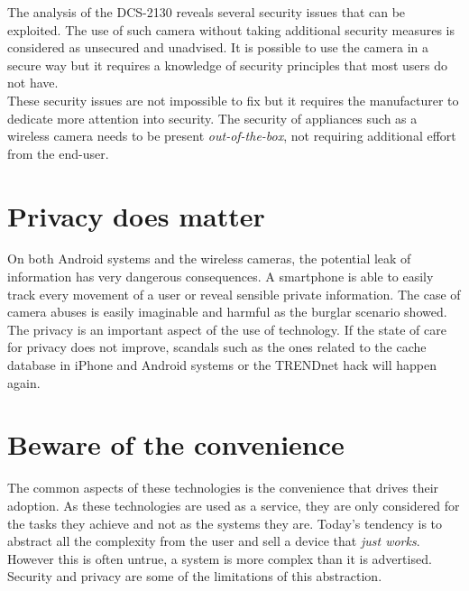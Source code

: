 The analysis of the DCS-2130 reveals several security issues that can be exploited.
The use of such camera without taking additional security measures is considered as unsecured and unadvised.
It is possible to use the camera in a secure way but it requires a knowledge of security principles that most users do not have.\\

These security issues are not impossible to fix but it requires the manufacturer to dedicate more attention into security.
The security of appliances such as a wireless camera needs to be present \emph{out-of-the-box}, not requiring additional effort from the end-user.

\section{Privacy does matter}

On both Android systems and the wireless cameras, the potential leak of information has very dangerous consequences.
A smartphone is able to easily track every movement of a user or reveal sensible private information.
The case of camera abuses is easily imaginable and harmful as the burglar scenario showed.\\

The privacy is an important aspect of the use of technology.
If the state of care for privacy does not improve, scandals such as the ones related to the cache database in iPhone and Android systems or the TRENDnet hack will happen again.

\section{Beware of the convenience}

The common aspects of these technologies is the convenience that drives their adoption.
As these technologies are used as a service, they are only considered for the tasks they achieve and not as the systems they are.
Today's tendency is to abstract all the complexity from the user and sell a device that \emph{just works}.
However this is often untrue, a system is more complex than it is advertised.
Security and privacy are some of the limitations of this abstraction.


